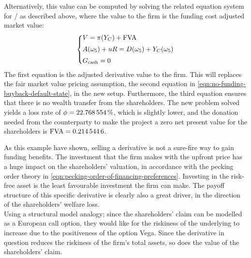 \documentclass[main.tex]{subfiles}
\begin{document}
            Alternatively, this value can be computed by solving the related equation system for \FCA/ as described above, where the value to the firm is the funding cost adjusted market value:
            \begin{align*}
                \left\{\begin{array}{@{}l@{}}
                    \displaystyle
                    V = \pi(Y_C) + \FVA/
                    \\[0.5em]
                    \displaystyle
                    A(\omega_5) + uR = D(\omega_5) + Y_C(\omega_5)
                    \\[0.5em]
                    G_{\text{cash}} = 0
                \end{array}\right.
            \end{align*}
            The first equation is the adjusted derivative value to the firm.
            This will replaces the fair market value pricing assumption, 
            the second equation in \cref{eqn:no-funding-buyback-default-state}, in the new setup.
            Furthermore, the third equation ensures that there is no wealth transfer from the shareholders.
            The new problem solved yields a loss rate of $\phi = \pct{0.22768554}$,
            which is slightly lower,
            and the donation needed from the counterparty to make the project a zero net present value for the shareholders is $\FVA/ = \num{0.2145446}$.

            As this example have shown, selling a derivative is not a sure-fire way
            to gain funding benefits.
            The investment that the firm makes with the upfront price has a huge impact 
            on the shareholders' valuation, in accordance with the pecking order theory
            in \cref{eqn:pecking-order-of-financing-preferences}.
            Investing in the risk-free asset is the least favourable investment the firm can make.
            The payoff structure of this specific derivative is clearly also a great driver,
            in the direction of the shareholders' welfare loss. 
            \\
            Using a structural model analogy;
            since the shareholders' claim can be modelled as a European call option,
            they would like for the riskiness of the underlying to increase
            due to the positiveness of the option Vega.
            Since the derivative in question reduces the riskiness of the firm's total assets,
            so does the value of the shareholders' claim.
\end{document}
